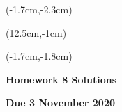 \documentclass[12pt, oneside]{article}
\begin{document}
\begin{textblock*}{4cm}(-1.7cm,-2.3cm)
\end{textblock*}

\begin{textblock*}{8cm}(12.5cm,-1cm)
\end{textblock*}
\begin{textblock*}{13.5cm}(-1.7cm,-1.8cm)
\end{textblock*}

\vspace{1cm}

\begin{center}
\textbf{\Large Homework 8 Solutions}

\textbf{Due 3 November 2020}
\end{center}
\end{document}

